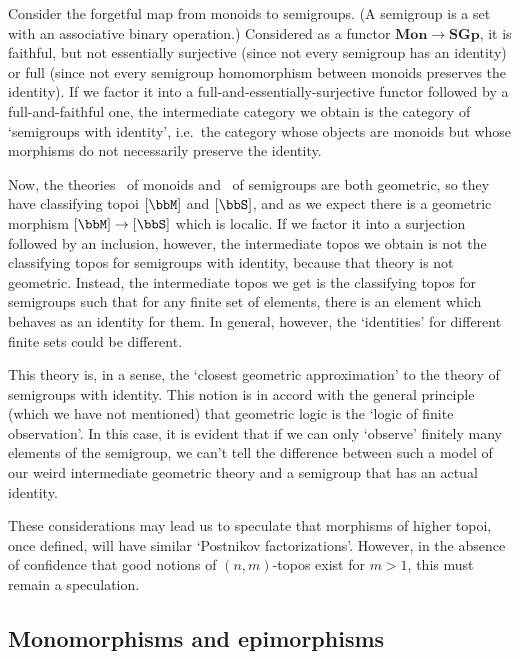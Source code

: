 \documentclass{amsart}
\begin{document}
\begin{eg}
  Consider the forgetful map from monoids to semigroups.  (A semigroup
  is a set with an associative binary operation.)  Considered as a
  functor $\mathbf{Mon}\to\mathbf{SGp}$, it is faithful, but not
  essentially surjective (since not every semigroup has an identity)
  or full (since not every semigroup homomorphism between monoids
  preserves the identity).  If we factor it into a
  full-and-essentially-surjective functor followed by a
  full-and-faithful one, the intermediate category we obtain is the
  category of `semigroups with identity', i.e.\ the category whose
  objects are monoids but whose morphisms do not necessarily preserve
  the identity.

  Now, the theories \bbM\ of monoids and \bbS\ of semigroups are both
  geometric, so they have classifying topoi $[\bbM]$ and $[\bbS]$, and
  as we expect there is a geometric morphism $[\bbM]\to [\bbS]$ which
  is localic.  If we factor it into a surjection followed by an
  inclusion, however, the intermediate topos we obtain is not the
  classifying topos for semigroups with identity, because that theory
  is not geometric.  Instead, the intermediate topos we get is the
  classifying topos for semigroups such that for any finite set of
  elements, there is an element which behaves as an identity for them.
  In general, however, the `identities' for different finite sets
  could be different.

  This theory is, in a sense, the `closest geometric approximation' to
  the theory of semigroups with identity.  This notion is in accord
  with the general principle (which we have not mentioned) that
  geometric logic is the `logic of finite observation'.  In this case,
  it is evident that if we can only `observe' finitely many elements
  of the semigroup, we can't tell the difference between such a model
  of our weird intermediate geometric theory and a semigroup that has
  an actual identity.
\end{eg}

These considerations may lead us to speculate that morphisms of higher
topoi, once defined, will have similar `Postnikov factorizations'.
However, in the absence of confidence that good notions of $(n,m)$-topos
exist for $m>1$, this must remain a speculation.

\subsection{Monomorphisms and epimorphisms}
\label{sec:monom-epim}
\end{document}
